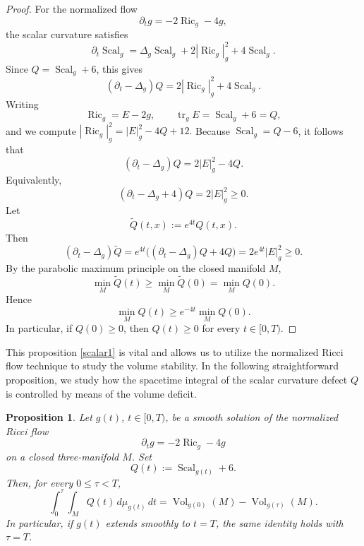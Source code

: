 \documentclass{amsart}
\newtheorem{proposition}{Proposition}[section]
\begin{document}
\begin{proof}
For the normalized flow
\[
        \partial_t g=-2\operatorname{Ric}_{g}-4g,
\]
the scalar curvature satisfies
\[
        \partial_t \operatorname{Scal}_{g}
        =
        \Delta_g \operatorname{Scal}_{g}
        +2|\operatorname{Ric}_{g}|_g^2
        +4\operatorname{Scal}_{g}.
\]
Since \(Q=\operatorname{Scal}_{g}+6\), this gives
\[
        (\partial_t-\Delta_g)Q
        =
        2|\operatorname{Ric}_{g}|_g^2
        +4\operatorname{Scal}_{g}.
\]
Writing
\[
        \operatorname{Ric}_{g}=E-2g,
        \qquad
        \operatorname{tr}_g E=\operatorname{Scal}_{g}+6=Q,
\]
and we compute
$|\operatorname{Ric}_{g}|_g^2=
        |E|_g^2-4Q+12.
$
Because \(\operatorname{Scal}_{g}=Q-6\), it follows that
\[
        (\partial_t-\Delta_g)Q
        =
        2|E|_g^2-4Q.
\]
Equivalently,
\[
        (\partial_t-\Delta_g+4)Q=2|E|_g^2\geq 0.
\]
Let
\[
        \widetilde Q(t,x):=e^{4t}Q(t,x).
\]
Then
\[
        (\partial_t-\Delta_g)\widetilde Q
        =
        e^{4t}\bigl((\partial_t-\Delta_g)Q+4Q\bigr)
        =
        2e^{4t}|E|_g^2
        \geq 0.
\]
By the parabolic maximum principle on the closed manifold \(M\),
\[
        \min_M \widetilde Q(t)\geq \min_M \widetilde Q(0)=\min_M Q(0).
\]
Hence
\[
        \min_M Q(t)\geq e^{-4t}\min_M Q(0).
\]
In particular, if \(Q(0)\geq0\), then \(Q(t)\geq0\) for every \(t\in[0,T)\).
\end{proof}
\noindent This proposition \ref{scalar1} is vital and allows us to utilize the normalized Ricci flow technique to study the volume stability. In the following straightforward proposition, we study how the spacetime integral of the scalar curvature defect $Q$ is controlled by means of the volume deficit. 
\begin{proposition}
\label{scalar2}
Let \(g(t)\), \(t\in[0,T)\), be a smooth solution of the normalized Ricci flow
\[
        \partial_t g=-2\operatorname{Ric}_{g}
        -4g
\]
on a closed three-manifold \(M\).  Set
\[
        Q(t):=\operatorname{Scal}_{g(t)}+6.
\]
Then, for every \(0\leq \tau<T\),
\[
        \int_0^\tau\int_M Q(t)\,d\mu_{g(t)}\,dt
        =
        \operatorname{Vol}_{g(0)}(M)-\operatorname{Vol}_{g(\tau)}(M).
\]
In particular, if \(g(t)\) extends smoothly to \(t=T\), the same identity holds with \(\tau=T\).
\end{proposition}
\end{document}

